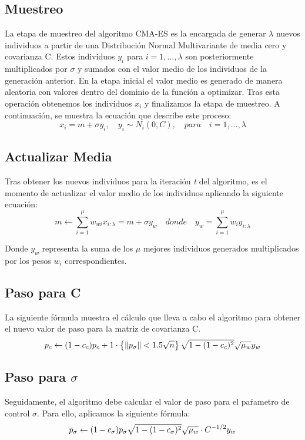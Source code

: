 \subsection{Muestreo}
La etapa de muestreo del algoritmo CMA-ES es la encargada de generar $\lambda$ nuevos individuos a partir de una Distribución Normal Multivariante de media cero y covarianza C. Estos individuos $y_{i}$ para $ i=1,...,\lambda $ son posteriormente multiplicados por $\sigma$ y sumados con el valor medio de los individuos de la generación anterior. En la etapa inicial el valor medio es generado de manera aleatoria con valores dentro del dominio de la función a optimizar. Tras esta operación obtenemos los individuos $x_{i}$ y finalizamos la etapa de muestreo. A continuación, se muestra la ecuación que describe este proceso: 
\begin{equation} \label{eq:1}
        x_{i} = m + \sigma y_{i},\quad y_{i}\sim N_{i}(0, C),\quad para\quad i=1,...,\lambda 
\end{equation}

\subsection{Actualizar Media}
Tras obtener los nuevos individuos para la iteración \textit{t} del algoritmo, es el momento de actualizar el valor medio de los individuos aplicando la siguiente ecuación: 
\begin{equation} \label{eq:2}
    m \leftarrow \sum_{i=1}^{\mu} w_{wi}x_{i:\lambda} = m + \sigma y_{w}\quad donde\quad y_{w} = \sum_{i=1}^{\mu} w_{i}y_{i:\lambda} 
\end{equation}

Donde $y_{w}$ representa la suma de los $\mu$ mejores individuos generados multiplicados por los pesos $w_{i}$ correspondientes.

\subsection{Paso para C}
La siguiente fórmula muestra el cálculo que lleva a cabo el algoritmo para obtener el nuevo valor de paso para la matriz de covarianza C.
\begin{equation} \label{eq:3}
   p_{c} \leftarrow (1 - c_{c})p_{c} + 1\cdot\left \{ \left \|p_{\sigma}\right \|< 1.5 \sqrt{n} \right \} \sqrt{1 - (1 - c_{c})^2}\sqrt{\mu_{w}}y_{w} \\
\end{equation}


\subsection{Paso para $ \sigma $}
Seguidamente, el algoritmo debe calcular el valor de paso para el paŕametro de control $\sigma$. Para ello, aplicamos la siguiente fórmula:
\begin{equation} \label{eq:4}
     p_{\sigma} \leftarrow (1 - c_{\sigma})p_{\sigma}\sqrt{1 - (1 - c_{\sigma})^2}\sqrt{\mu_{w}}\cdot C^{-1/2}y_{w} \\
\end{equation}

